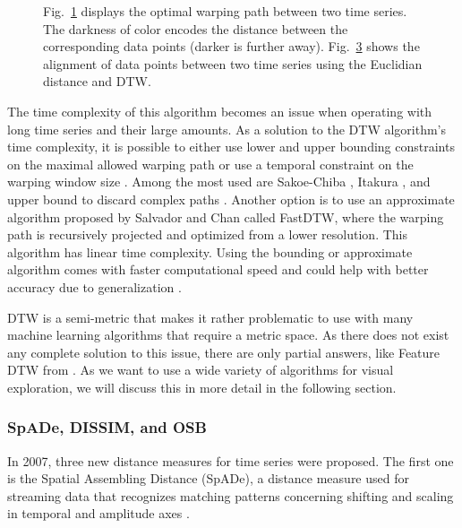 \begin{figure}[ht]
     \centering
     \begin{subfigure}[b]{0.495\textwidth}
        \centering
        
        \caption{}
        \label{fig:dtw_warping}
     \end{subfigure}
     \hfill
     \begin{subfigure}[b]{0.495\textwidth}
        \centering
        
        \caption{}
        \label{fig:Euclid_vs_DTW}
     \end{subfigure}
    \caption{
        Fig.~\ref{fig:dtw_warping} displays the optimal warping path between two time series. The darkness of color encodes the distance between the corresponding data points (darker is further away). Fig.~\ref{fig:Euclid_vs_DTW} shows the alignment of data points between two time series using the Euclidian distance and DTW.
    }
\end{figure}

The time complexity of this algorithm becomes an issue when operating with long time series and their large amounts. As a solution to the DTW algorithm's time complexity, it is possible to either use lower and upper bounding constraints on the maximal allowed warping path \cite{met:dtw-koegh-rata} or use a temporal constraint on the warping window size \cite{met:dtw-window}. Among the most used are Sakoe-Chiba \cite{met:dtw-window}, Itakura \cite{met:dtw-itakura}, and upper bound to discard complex paths \cite{met:DTW-zheng}. Another option is to use an approximate algorithm proposed by Salvador and Chan \cite{met:FastDTW} called FastDTW, where the warping path is recursively projected and optimized from a lower resolution. This algorithm has linear time complexity. Using the bounding or approximate algorithm comes with faster computational speed and could help with better accuracy due to generalization \cite{met:fDTW}.

DTW is a semi-metric that makes it rather problematic to use with many machine learning algorithms that require a metric space. As there does not exist any complete solution to this issue, there are only partial answers, like Feature DTW from \textcite{met:fDTW}. As we want to use a wide variety of algorithms for visual exploration, we will discuss this in more detail in the following section.

\subsubsection{SpADe, DISSIM, and OSB}
In 2007, three new distance measures for time series were proposed. The first one is the Spatial Assembling Distance (SpADe), a distance measure used for streaming data that recognizes matching patterns concerning shifting and scaling in temporal and amplitude axes \cite{met:spade}.

